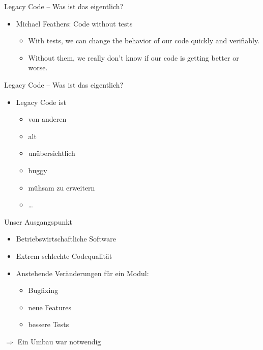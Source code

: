 \begin{frame}[fragile]{Legacy Code -- Was ist das eigentlich?}
\begin{itemize}
\item Michael Feathers: \glqq Code without tests\grqq
\begin{itemize}
\item \glqq With tests, we can change the behavior of our code quickly and verifiably.\grqq
\item \glqq Without them, we really don't know if our code is getting better or worse.\grqq
\end{itemize}

\end{itemize}

\end{frame}


\begin{frame}[fragile]{Legacy Code -- Was ist das eigentlich?}
\begin{itemize}
\item Legacy Code ist
\begin{itemize}
\item von anderen
\item alt
\item unübersichtlich
\item buggy
\item mühsam zu erweitern
\item …
\end{itemize}
\end{itemize}

\end{frame}


\begin{frame}[fragile]{Unser Ausgangspunkt}
\begin{itemize}
\item Betriebswirtschaftliche Software
\item Extrem schlechte Codequalität
\item Anstehende Veränderungen für ein Modul:
\begin{itemize}
\item Bugfixing
\item neue Features
\item bessere Tests
\end{itemize}
\end{itemize}

$\Rightarrow$ Ein Umbau war notwendig
\end{frame}

